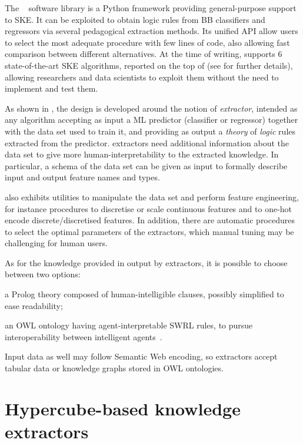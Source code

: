 \documentclass[
]{ceurart}
\begin{document}
The \psyke{}~\cite{psyke-woa2021,psyke-ia2022} software library is a Python framework providing general-purpose support to SKE.
%
It can be exploited to obtain logic rules from BB classifiers and regressors via several pedagogical extraction methods.
%
Its unified API allow users to select the most adequate procedure with few lines of code, also allowing fast comparison between different alternatives.
%
At the time of writing, \psyke{} supports 6 state-of-the-art SKE algorithms, reported on the top of  (see  for further details), allowing researchers and data scientists to exploit them without the need to implement and test them.

As shown in , the \psyke{} design is developed around the notion of \emph{extractor}, intended as any algorithm accepting as input a ML predictor (classifier or regressor) together with the data set used to train it, and providing as output a \emph{theory} of \emph{logic} rules extracted from the predictor.
%
\psyke{} extractors need additional information about the data set to give more human-interpretability to the extracted knowledge.
In particular, a schema of the data set can be given as input to formally describe input and output feature names and types.

\psyke{} also exhibits utilities to manipulate the data set and perform feature engineering, for instance procedures to discretise or scale continuous features and to one-hot encode discrete/discretised features.
%
In addition, there are automatic procedures to select the optimal parameters of the extractors, which manual tuning may be challenging for human users.

As for the knowledge provided in output by extractors, it is possible to choose between two options:
\begin{inlinelist}
	\item a Prolog theory composed of human-intelligible clauses, possibly simplified to ease readability;
	\item an OWL ontology having agent-interpretable SWRL rules, to pursue interoperability between intelligent agents~\cite{psyke-extraamas2022}.
\end{inlinelist}
%
Input data as well may follow Semantic Web encoding, so \psyke{} extractors accept tabular data or knowledge graphs stored in OWL ontologies.

\section{Hypercube-based knowledge extractors}\label{sec:contribution}
\end{document}
